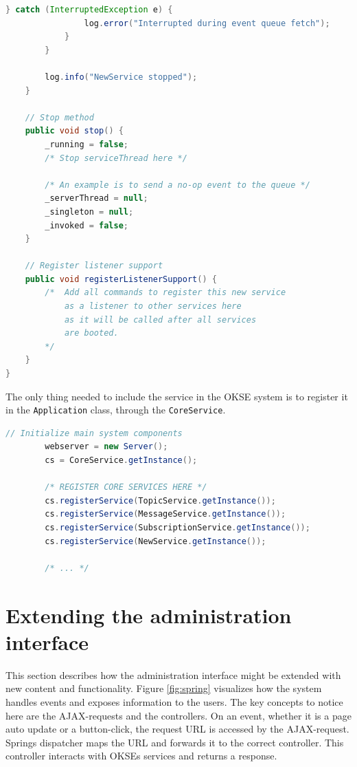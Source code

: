 \begin{lstlisting}[language=Java, captionpos=b, caption=Creating a new core service, frame=bt, showstringspaces=false]
            } catch (InterruptedException e) {
                log.error("Interrupted during event queue fetch");
            }
        }
        
        log.info("NewService stopped");
    }
    
    // Stop method
    public void stop() {
        _running = false;
        /* Stop serviceThread here */
        
        /* An example is to send a no-op event to the queue */
        _serverThread = null;
        _singleton = null;
        _invoked = false;
    }
    
    // Register listener support
    public void registerListenerSupport() {
        /*  Add all commands to register this new service
            as a listener to other services here
            as it will be called after all services
            are booted.
        */
    }
}
\end{lstlisting}

The only thing needed to include the service in the OKSE system is to register it in the \verb!Application! class, through the \verb!CoreService!.

\begin{lstlisting}[language=Java, captionpos=b, caption=Registering a new service, frame=bt, showstringspaces=false]
        // Initialize main system components
        webserver = new Server();
        cs = CoreService.getInstance();

        /* REGISTER CORE SERVICES HERE */
        cs.registerService(TopicService.getInstance());
        cs.registerService(MessageService.getInstance());
        cs.registerService(SubscriptionService.getInstance());
        cs.registerService(NewService.getInstance());

        /* ... */
\end{lstlisting}

\section{Extending the administration interface}
\label{sec:adding-new-panes}

This section describes how the administration interface might be extended with new content and functionality. Figure \ref{fig:spring} visualizes how the system handles events and exposes information to the users. The key concepts to notice here are the AJAX-requests and the controllers. On an event, whether it is a page auto update or a button-click, the request URL is accessed by the AJAX-request. Springs dispatcher maps the URL and forwards it to the correct controller. This controller interacts with OKSEs services and returns a response.

